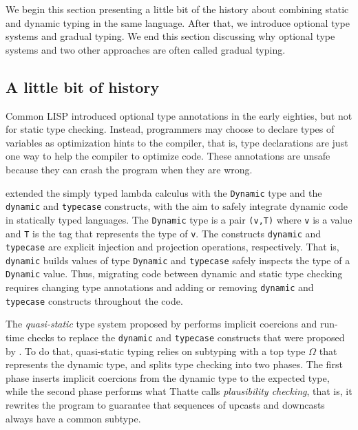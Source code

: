 \documentclass[preprint]{sig-alternate}
\begin{document}
We begin this section presenting a little bit of the history about
combining static and dynamic typing in the same language.
After that, we introduce optional type systems and gradual typing.
We end this section discussing why optional type systems and two
other approaches are often called gradual typing.

\subsection{A little bit of history}

Common LISP \citep{steele1982ocl} introduced optional type annotations
in the early eighties, but not for static type checking.
Instead, programmers may choose to declare types of variables as
optimization hints to the compiler, that is, type declarations are
just one way to help the compiler to optimize code.
These annotations are unsafe because they can crash the program
when they are wrong.

\citet{abadi1989dts} extended the simply typed lambda calculus with the
\texttt{Dynamic} type and the \texttt{dynamic} and \texttt{typecase}
constructs, with the aim to safely integrate dynamic code in
statically typed languages.
The \texttt{Dynamic} type is a pair \texttt{(v,T)} where \texttt{v} is a
value and \texttt{T} is the tag that represents the type of \texttt{v}.
The constructs \texttt{dynamic} and \texttt{typecase} are explicit
injection and projection operations, respectively.
That is, \texttt{dynamic} builds values of type \texttt{Dynamic} and
\texttt{typecase} safely inspects the type of a \texttt{Dynamic} value.
Thus, migrating code between dynamic and static type checking requires
changing type annotations and adding or removing \texttt{dynamic} and
\texttt{typecase} constructs throughout the code.

The \textit{quasi-static} type system proposed by \citet{thatte1990qst}
performs implicit coercions and run-time checks to replace the
\texttt{dynamic} and \texttt{typecase} constructs that were proposed by
\citet{abadi1989dts}.
To do that, quasi-static typing relies on subtyping with a top type
$\Omega$ that represents the dynamic type, and splits type checking
into two phases.
The first phase inserts implicit coercions from the dynamic type to
the expected type, while the second phase performs what Thatte calls
\textit{plausibility checking}, that is, it rewrites the program to
guarantee that sequences of upcasts and downcasts always have a
common subtype.
\end{document}
